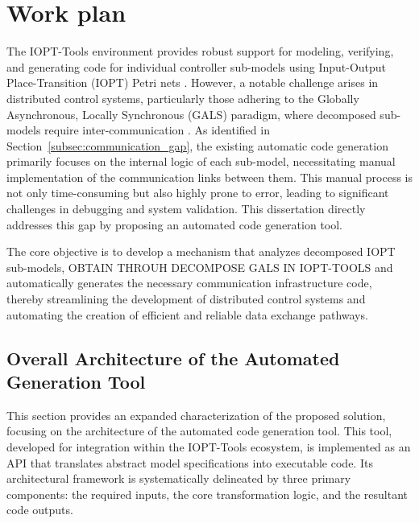 
%

\chapter{Work plan}
\label{cha:work_plan}



 The IOPT-Tools environment provides robust support for modeling, verifying, and generating code for individual controller sub-models using Input-Output Place-Transition (IOPT) Petri nets \cite{iopttools, barros2004, RefiningIOPT}. However, a notable challenge arises in distributed control systems, particularly those adhering to the Globally Asynchronous, Locally Synchronous (GALS) paradigm, where decomposed sub-models require inter-communication \cite{galsactd, Barrosadd}. As identified in Section~\ref{subsec:communication_gap}, the existing automatic code generation primarily focuses on the internal logic of each sub-model, necessitating manual implementation of the communication links between them. This manual process is not only time-consuming but also highly prone to error, leading to significant challenges in debugging and system validation. This dissertation directly addresses this gap by proposing an automated code generation tool.
 
 The core objective is to develop a mechanism that analyzes decomposed IOPT sub-models, OBTAIN THROUH DECOMPOSE GALS IN IOPT-TOOLS and automatically generates the necessary communication infrastructure code, thereby streamlining the development of distributed control systems and automating the creation of efficient and reliable data exchange pathways.
 
 
\section{Overall Architecture of the Automated Generation Tool}
\label{sec:overall_architecture}

This section provides an expanded characterization of the proposed solution, focusing on the architecture of the automated code generation tool. This tool, developed for integration within the IOPT-Tools ecosystem, is implemented as an API that translates abstract model specifications into executable code. Its architectural framework is systematically delineated by three primary components: the required inputs, the core transformation logic, and the resultant code outputs.

